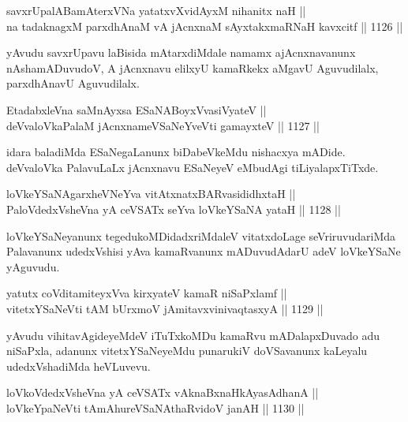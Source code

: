 \begin{shl}
savxrUpalABamAterxVNa yatatxvXvidAyxM nihanitx naH || \\
na tadaknagxM parxdhAnaM vA jAcnxnaM sAyxtakxmaRNaH kavxcitf \hfill || 1126 ||  
\end{shl}

\begin{artha}
yAvudu savxrUpavu laBisida mAtarxdiMdale namamx ajAcnxnavanunx nAshamADuvudoV, A jAcnxnavu elilxyU kamaRkekx aMgavU Aguvudilalx, parxdhAnavU Aguvudilalx.
\end{artha}

\begin{shl}
EtadabxleVna saMnAyxsa ESaNABoyxV\s vasiVyateV ||  \\
deVvaloVkaPalaM jAcnxnameVSaNeYveVti gamayxteV \hfill || 1127 ||  
\end{shl}

\begin{artha}
idara baladiMda ESaNegaLanunx biDabeVkeMdu nishacxya mADide. deVvaloVka PalavuLaLx jAcnxnavu ESaNeyeV eMbudAgi tiLiyalapxTiTxde.
\end{artha}

\begin{shl}
loVkeYSaNAgarxheVNeYva vitAtxnatxBARvasididhxtaH || \\
PaloVdedxVsheVna yA ceVSATx seYva loVkeYSaNA yataH \hfill || 1128 ||  
\end{shl}

\begin{artha}
loVkeYSaNeyanunx tegedukoMDidadxriMdaleV vitatxdoLage seVriruvudariMda Palavanunx udedxVshisi yAva kamaRvanunx mADuvudAdarU adeV loVkeYSaNe yAguvudu.
\end{artha}

\begin{shl}
yatutx coVditamiteyxVva kirxyateV kamaR niSaPxlamf || \\
vitetxYSaNeVti tAM bUrxmoV jAmitavxvinivaqtasxyA \hfill || 1129 ||  
\end{shl}

\begin{artha}
yAvudu vihitavAgideyeMdeV iTuTxkoMDu kamaRvu mADalapxDuvado adu niSaPxla, adanunx vitetxYSaNeyeMdu punarukiV doVSavanunx kaLeyalu udedxVshadiMda heVLuvevu.
\end{artha}


\begin{shl}
loVkoVdedxVsheVna yA ceVSATx vAknaBxnaHkAyasAdhanA || \\
loVkeYpaNeVti tAmAhureVSaNAthaRvidoV janAH \hfill || 1130 ||  
\end{shl}

